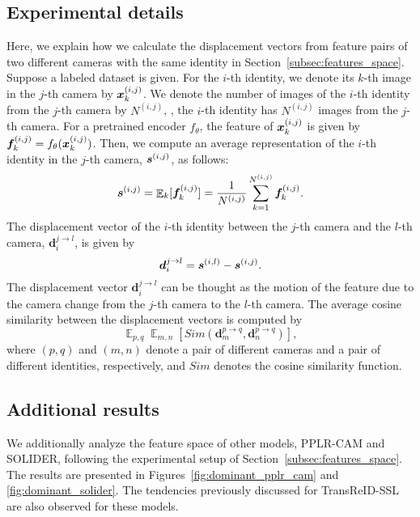 \subsection{Experimental details}
\label{sup:features_space_details}
Here, we explain how we calculate the displacement vectors from feature pairs of two different cameras with the same identity in Section~\ref{subsec:features_space}.
Suppose a labeled dataset is given.
For the $i$-th identity, we denote its $k$-th image in the $j$-th camera by ${\bm{x}}_{k}^{(i,j)}$.
We denote the number of images of the $i$-th identity from the $j$-th camera by $N^{(i, j)}$, \ie, the $i$-th identity has $N^{(i, j)}$ images from the $j$-th camera.
For a pretrained encoder $f_\theta$, the feature of ${\bm{x}}_{k}^{(i,j)}$ is given by ${\bm{f}}_{k}^{(i,j)} = f_\theta({\bm{x}}_{k}^{(i,j)})$.
Then, we compute an average representation of the $i$-th identity in the $j$-th camera, ${\bm{s}}^{(i,j)}$, as follows:
\begin{equation}
    {\bm{s}}^{(i,j)} 
    = {\mathop{\mathbb{E}}}_{k} [{\bm{f}}_{k}^{(i,j)}]
    = \frac{1}{N^{(i, j)}} \sum_{k=1}^{N^{(i, j)}} {\bm{f}}_{k}^{(i,j)}.
\end{equation}
The displacement vector of the $i$-th identity between the $j$-th camera and the $l$-th camera, $\bm{d}_{i}^{j \rightarrow l}$, is given by
\begin{equation}
    \bm{d}_{i}^{j \rightarrow l} = {\bm{s}}^{(i,l)} - {\bm{s}}^{(i,j)}.
\end{equation}
The displacement vector $\bm{d}_{i}^{j \rightarrow l}$ can be thought as the motion of the feature due to the camera change from the $j$-th camera to the $l$-th camera.
The average cosine similarity between the displacement vectors is computed by
\begin{equation}
    {\mathop{\mathbb{E}}}_{p, q}
    {\mathop{\mathbb{E}}}_{m,n} [Sim(
        \bm{d}_{m}^{p \rightarrow q}, 
        \bm{d}_{n}^{p \rightarrow q}
    )],
\end{equation}
where $(p, q)$ and $(m, n)$ denote a pair of different cameras and a pair of different identities, respectively, and $Sim$ denotes the cosine similarity function.


\subsection{Additional results}
\label{sup:features_space_additional}

We additionally analyze the feature space of other models, PPLR-CAM and SOLIDER, following the experimental setup of Section~\ref{subsec:features_space}.
The results are presented in Figures~\ref{fig:dominant_pplr_cam} and \ref{fig:dominant_solider}.
The tendencies previously discussed for TransReID-SSL are also observed for these models.


